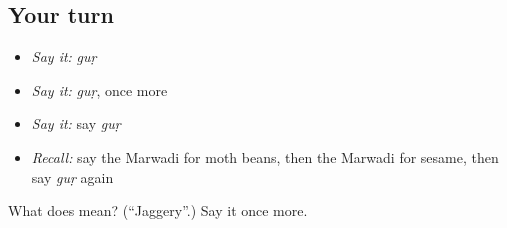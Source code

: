 \subsection*{Your turn}
\begin{itemize}
\raggedright
  \item \emph{Say it:} \emph{guṛ}
  \item \emph{Say it:} \emph{guṛ}, once more
  \item \emph{Say it:} say \emph{guṛ}
  \item \emph{Recall:} say the Marwadi for moth beans, then the Marwadi for sesame, then say \emph{guṛ} again
\end{itemize}

\begin{tcolorbox}[breakable,colback=teal!4,colframe=teal!35!black,title={Before you move on}]
What does  mean? (\textquotedblleft{}Jaggery\textquotedblright{}.) Say it once more.
\end{tcolorbox}
